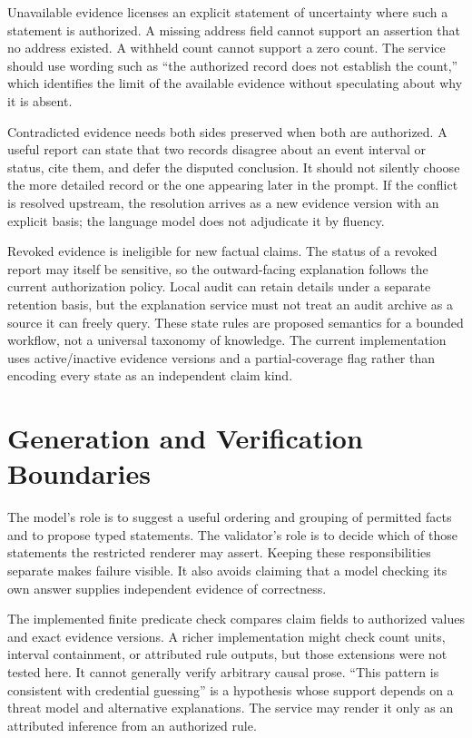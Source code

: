 Unavailable evidence licenses an explicit statement of uncertainty where such a statement is authorized. A missing address field cannot support an assertion that no address existed. A withheld count cannot support a zero count. The service should use wording such as ``the authorized record does not establish the count,'' which identifies the limit of the available evidence without speculating about why it is absent.

Contradicted evidence needs both sides preserved when both are authorized. A useful report can state that two records disagree about an event interval or status, cite them, and defer the disputed conclusion. It should not silently choose the more detailed record or the one appearing later in the prompt. If the conflict is resolved upstream, the resolution arrives as a new evidence version with an explicit basis; the language model does not adjudicate it by fluency.

Revoked evidence is ineligible for new factual claims. The status of a revoked report may itself be sensitive, so the outward-facing explanation follows the current authorization policy. Local audit can retain details under a separate retention basis, but the explanation service must not treat an audit archive as a source it can freely query. These state rules are proposed semantics for a bounded workflow, not a universal taxonomy of knowledge. The current implementation uses active/inactive evidence versions and a partial-coverage flag rather than encoding every state as an independent claim kind.

\section{Generation and Verification Boundaries}
The model's role is to suggest a useful ordering and grouping of permitted facts and to propose typed statements. The validator's role is to decide which of those statements the restricted renderer may assert. Keeping these responsibilities separate makes failure visible. It also avoids claiming that a model checking its own answer supplies independent evidence of correctness.

The implemented finite predicate check compares claim fields to authorized values and exact evidence versions. A richer implementation might check count units, interval containment, or attributed rule outputs, but those extensions were not tested here. It cannot generally verify arbitrary causal prose. ``This pattern is consistent with credential guessing'' is a hypothesis whose support depends on a threat model and alternative explanations. The service may render it only as an attributed inference from an authorized rule.

